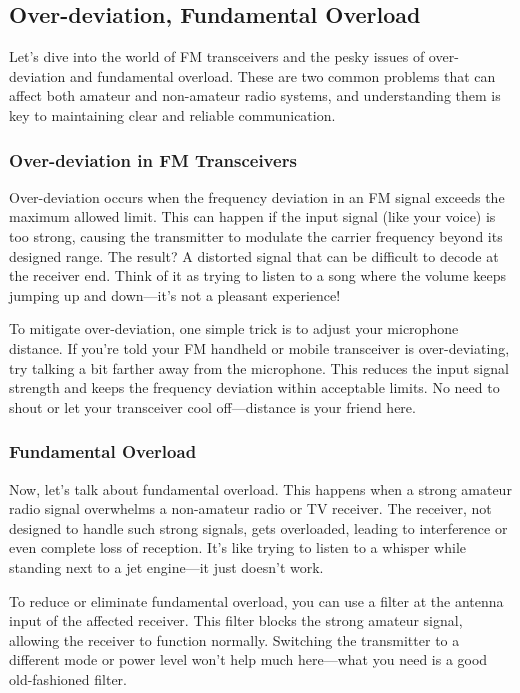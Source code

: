\subsection{Over-deviation, Fundamental Overload}
\label{subsec:over-dev}

Let's dive into the world of FM transceivers and the pesky issues of over-deviation and fundamental overload. These are two common problems that can affect both amateur and non-amateur radio systems, and understanding them is key to maintaining clear and reliable communication.

\subsubsection*{Over-deviation in FM Transceivers}

Over-deviation occurs when the frequency deviation in an FM signal exceeds the maximum allowed limit. This can happen if the input signal (like your voice) is too strong, causing the transmitter to modulate the carrier frequency beyond its designed range. The result? A distorted signal that can be difficult to decode at the receiver end. Think of it as trying to listen to a song where the volume keeps jumping up and down—it’s not a pleasant experience!

To mitigate over-deviation, one simple trick is to adjust your microphone distance. If you’re told your FM handheld or mobile transceiver is over-deviating, try talking a bit farther away from the microphone. This reduces the input signal strength and keeps the frequency deviation within acceptable limits. No need to shout or let your transceiver cool off—distance is your friend here.

\subsubsection*{Fundamental Overload}

Now, let’s talk about fundamental overload. This happens when a strong amateur radio signal overwhelms a non-amateur radio or TV receiver. The receiver, not designed to handle such strong signals, gets overloaded, leading to interference or even complete loss of reception. It’s like trying to listen to a whisper while standing next to a jet engine—it just doesn’t work.

To reduce or eliminate fundamental overload, you can use a filter at the antenna input of the affected receiver. This filter blocks the strong amateur signal, allowing the receiver to function normally. Switching the transmitter to a different mode or power level won’t help much here—what you need is a good old-fashioned filter.

